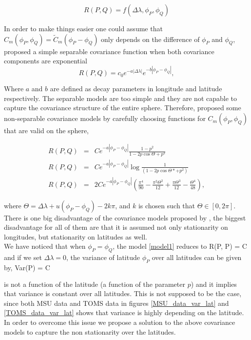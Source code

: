 			\[
				R(P,Q) = f(\Delta\lambda, \phi_P,\phi_Q)
			\]
					
			In order to make things easier one could assume that $C_m(\phi_P, \phi_Q) = \tilde{C}_m(\phi_P - \phi_Q)$ only depends on the difference of $\phi_P$ and $\phi_Q$, \cite{HuangZhangRobeson2011} proposed a simple separable covariance function when both covariance components are exponential
			\[
				R(P, Q) = c_0e^{-a|\Delta \lambda|}e^{-b|\phi_P - \phi_Q|},
			\]
					
			Where $a$ and $b$ are defined as decay parameters in longitude and latitude respectively. The separable models are too simple and they are not capable to capture the covariance structure of the entire sphere. Therefore, \cite{Huang2012} proposed some non-separable covariance models by carefully choosing functions for $C_m(\phi_P, \phi_Q)$  that are valid on the sphere,
					
			\begin{eqnarray}
				R(P,Q) &=& Ce^{-a|\phi_P-\phi_Q|} \frac{1-p^2}{1-2p \cos\Theta+p^2} \label{model1} \\
				R(P,Q) &=& Ce^{-a|\phi_P-\phi_Q|} \log\frac{1}{(1-2p\cos\Theta* + p^2)} \label{model2} \\
				R(P,Q) &=& 2Ce^{-a|\phi_P-\phi_Q|}\left(\frac{\pi^4}{90}-\frac{\pi^2\Theta^2}{12}+\frac{\pi\Theta^3}{12}-\frac{\Theta^4}{48}\right), \label{model3}
			\end{eqnarray}
			
			where $\Theta = \Delta\lambda + u(\phi_P - \phi_Q) - 2k\pi$, and $k$ is chosen such that $\Theta \in [0,2\pi]$.\\
			
			There is one big disadvantage of the covariance models proposed by \cite{Huang2012}, the biggest disadvantage for all of them are that it is assumed not only stationarity on longitudes, but stationarity on latitudes as well. \\
			
			We have noticed that when $\phi_P = \phi_Q$, the model \ref{model1} reduces to
			\beq
			\nonumber
			R(P, P) = C
			\eeq
			and if we set $\Delta \lambda = 0$, the variance of latitude $\phi_P$ over all latitudes can be given by,
			\beq
			\nonumber
			Var(P) = C
			\eeq
					      		      
			is not a function of the latitude (a function of the parameter $p$) and it implies that variance is constant over all latitudes. This is not supposed to be the case, since both MSU data and TOMS data in figures \ref{MSU_data_var_lat} and \ref{TOMS_data_var_lat} shows that variance is highly depending on the latitude. In order to overcome this issue we propose a solution to the above covariance models to capture the non stationarity over the latitudes.		      
			
